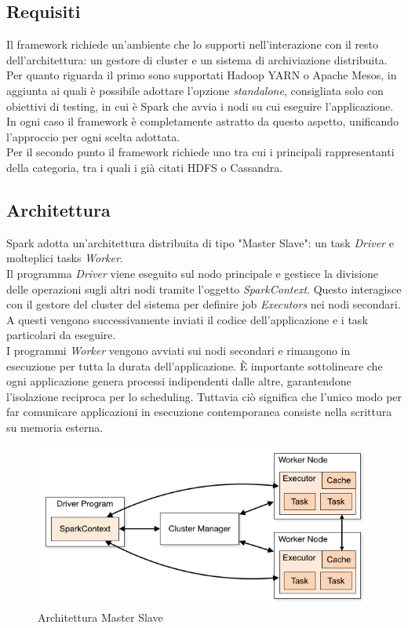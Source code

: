 \subsection{Requisiti} 
Il framework richiede un'ambiente che lo supporti nell'interazione con il resto dell'architettura: un gestore di cluster e un sistema di archiviazione distribuita.\\ 
Per quanto riguarda il primo sono supportati Hadoop YARN o Apache Mesos, in aggiunta ai quali è possibile adottare l'opzione \textit{standalone}, consigliata solo con obiettivi di testing, in cui è Spark che avvia i nodi su cui eseguire l'applicazione. In ogni caso il framework è completamente astratto da questo aspetto, unificando l'approccio per ogni scelta adottata.\\
Per il secondo punto il framework richiede uno tra cui i principali rappresentanti della categoria, tra i quali i già citati HDFS o Cassandra.

\subsection{Architettura}
Spark adotta un'architettura distribuita di tipo "Master Slave": un task \textit{Driver} e molteplici tasks \textit{Worker}.\\ 
Il programma \textit{Driver} viene eseguito sul nodo principale e gestisce la divisione delle operazioni sugli altri nodi tramite l'oggetto \textit{SparkContext}. Questo interagisce con il gestore del cluster del sistema per definire job \textit{Executors} nei nodi secondari. A questi vengono successivamente inviati il codice dell'applicazione e i task particolari da eseguire.\\
I programmi \textit{Worker} vengono avviati sui nodi secondari e rimangono in esecuzione per tutta la durata dell'applicazione. È importante sottolineare che ogni applicazione genera processi indipendenti dalle altre, garantendone l'isolazione reciproca per lo scheduling. Tuttavia ciò significa che l'unico modo per far comunicare applicazioni in esecuzione contemporanea consiste nella scrittura su memoria esterna.

\begin{figure}[h]
	\centering
	\includegraphics[scale=0.75]{Figures/spark_architecture.png}
	\decoRule
	\caption[Architettura Spark]{Architettura Master Slave}
	\label{fig:Architettura Spark}
\end{figure}


